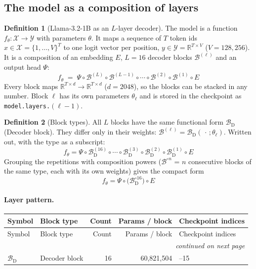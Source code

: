 \documentclass[10pt,a4paper]{article}
\theoremstyle{definition}
\newtheorem{definition}{Definition}[section]
\begin{document}
\subsection{The model as a composition of layers}\label{sec:comp}
\begin{definition}[Llama-3.2-1B as an $L$-layer decoder]
The model is a function $f_\theta:\mathcal{X}\to\mathcal{Y}$ with parameters $\theta$. It maps a sequence of $T$ token ids $x\in\mathcal{X}=\{1,\dots,V\}^{T}$ to one logit vector per position, $y\in\mathcal{Y}=\mathbb{R}^{T\times V}$ ($V=128{,}256$). It is a composition of an embedding $E$, $L=16$ decoder blocks $\mathcal{B}^{(\ell)}$ and an output head $\Psi$:
\begin{equation}
  f_\theta \;=\; \Psi\circ\mathcal{B}^{(L)}\circ\mathcal{B}^{(L-1)}\circ\cdots\circ\mathcal{B}^{(2)}\circ\mathcal{B}^{(1)}\circ E
\end{equation}
Every block maps $\mathbb{R}^{T\times d}\to\mathbb{R}^{T\times d}$ ($d=2048$), so the blocks can be stacked in any number. Block $\ell$ has its own parameters $\theta_\ell$ and is stored in the checkpoint as \texttt{model.layers.}$(\ell-1)$.
\end{definition}
\begin{definition}[Block types]
All $L$ blocks have the same functional form $\mathcal{B}_{\mathrm{D}}$ (Decoder block). They differ only in their weights: $\mathcal{B}^{(\ell)}=\mathcal{B}_{\mathrm{D}}(\,\cdot\,;\theta_\ell)$.
Written out, with the type as a subscript:
\begin{equation}
  f_\theta = \Psi\circ \mathcal{B}^{(16)}_{\mathrm{D}}\circ \cdots\circ \mathcal{B}^{(3)}_{\mathrm{D}}\circ \mathcal{B}^{(2)}_{\mathrm{D}}\circ \mathcal{B}^{(1)}_{\mathrm{D}}\circ E
\end{equation}
Grouping the repetitions with composition powers ($\mathcal{B}^{\circ n}$ = $n$ consecutive blocks of the same type, each with its own weights) gives the compact form
\begin{equation}\label{eq:compact}
  f_\theta = \Psi\circ\Big(\mathcal{B}_{\mathrm{D}}^{\circ 16}\Big)\circ E
\end{equation}
\end{definition}
\paragraph{Layer pattern.}
\begin{longtable}{l>{\raggedright\arraybackslash}p{5.6cm}rr>{\raggedright\arraybackslash}p{4.4cm}}
\toprule
Symbol & Block type & Count & Params / block & Checkpoint indices \\
\midrule
\endfirsthead
\toprule
Symbol & Block type & Count & Params / block & Checkpoint indices \\
\midrule
\endhead
\midrule \multicolumn{5}{r}{\textit{continued on next page}} \\
\endfoot
\bottomrule
\endlastfoot
$\mathcal{B}_{\mathrm{D}}$ & Decoder block & 16 & 60,821,504 & 0--15 \\
\end{longtable}
\end{document}
